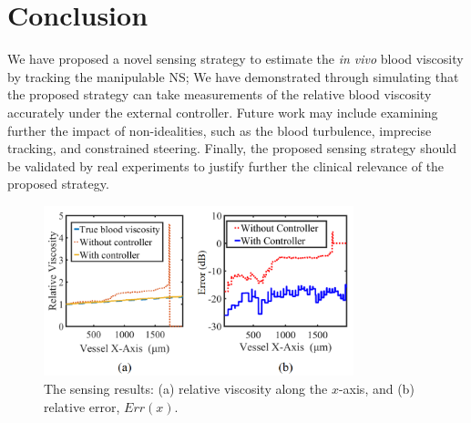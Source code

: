 \documentclass[conference]{IEEEtran}
\begin{document}
\section{Conclusion}


We have proposed a novel sensing strategy to estimate the \emph{in vivo} blood viscosity by tracking the manipulable NS; We have demonstrated through simulating that the proposed strategy can take measurements of the relative blood viscosity accurately under the external controller. Future work may include examining further the impact of non-idealities, such as the blood turbulence, imprecise tracking, and constrained steering. Finally, the proposed sensing strategy should be validated by real experiments to justify further the clinical relevance of the proposed strategy.

\begin{figure}
\centering
\includegraphics[width=9cm]{fig_rsterr.png}
\caption{The sensing results: (a) relative viscosity along the $x$-axis, and (b) relative error, $Err(x)$.}
\label{fig_rst}
\end{figure}




\end{document}
